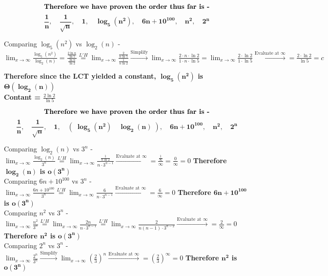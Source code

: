 \documentclass[9pt]{article}
\newcommand{\lp}{\left(}
\newcommand{\rp}{\right)}
\begin{document}
$$\text{\textbf{Therefore we have proven the order thus far is -}} $$
$$\mathbf{\frac{1}{n},\quad \frac{1}{\sqrt n} ,\quad 1,\quad \log_5 (n^2) ,\quad 6n+10^{100},\quad n^2,\quad 2^n}$$

Comparing $\log_5 (n^2)$ vs $\log_2 (n)$ - \\
$ \displaystyle \lim_{x \to \infty} \frac{\log_5 (n^2)}{\log_2 (n)} = \frac{\frac{2 \ln n}{\ln 5}}{\frac{\ln n}{\ln 2}} \stackrel{L'H}{=} \lim_{x \to \infty} \frac{\frac{2}{n\ln 5}}{\frac{1}{n\ln 2}} \stackrel{\text{Simplify}}{\rightarrow} \lim_{x \to \infty} \frac{2 \cdot n \cdot \ln 2}{1 \cdot n \cdot \ln 5} = \lim_{x \to \infty} \frac{2 \cdot \ln 2}{1 \cdot \ln 5} \stackrel{\text{Evaluate at }\infty}{\rightarrow} = \frac{2 \cdot \ln 2}{\ln 5} = c$\\
\begin{flushright}
\textbf{Therefore since the LCT yielded a constant, $\mathbf{\log_5 (n^2)}$ is $\mathbf{\Theta(\log_2 (n))}$}\\
\textbf{Contant = $\frac{2 \ln 2}{\ln 5}$}\\
\end{flushright}

$$\text{\textbf{Therefore we have proven the order thus far is -}} $$
$$\mathbf{\frac{1}{n},\quad \frac{1}{\sqrt n} ,\quad 1,\quad \lp\; \log_5 (n^2)\quad \log_2 (n) \;\rp,\quad 6n+10^{100},\quad n^2,\quad 2^n}$$

\newpage

Comparing $\log_2 (n)$ vs $3^n$ - \\
$ \displaystyle \lim_{x \to \infty} \frac{\log_2 (n)}{3^n} \stackrel{L'H}{=} \lim_{x \to \infty} \frac{\frac{1}{n \ln 2}}{n \cdot 3^{n-1}} \stackrel{\text{Evaluate at }\infty}{\rightarrow}  = \frac{\frac{1}{\infty}}{\infty} = \frac{0}{\infty} = 0$ \hfill \textbf{Therefore $\mathbf{\log_2 (n)}$ is $\mathbf{o(3^n)}$}\\
Comparing $6n+10^{100}$ vs $3^n$ - \\
$ \displaystyle \lim_{x \to \infty} \frac{6n+10^{100}}{3^n} \stackrel{L'H}{=} \lim_{x \to \infty} \frac{6}{n \cdot 3^{n-1}} \stackrel{\text{Evaluate at }\infty}{\rightarrow}  = \frac{6}{\infty} = 0$ \hfill \textbf{Therefore $\mathbf{6n+10^{100}}$ is $\mathbf{o(3^n)}$}\\
Comparing $n^2$ vs $3^n$ - \\
$ \displaystyle \lim_{x \to \infty} \frac{n^2}{3^n} \stackrel{L'H}{=} \lim_{x \to \infty} \frac{2n}{n \cdot 3^{n-1}} \stackrel{L'H}{=} \lim_{x \to \infty} \frac{2}{n(n-1) \cdot 3^{n-2}} \stackrel{\text{Evaluate at }\infty}{\rightarrow}  = \frac{2}{\infty} = 0$ \hfill \textbf{Therefore $\mathbf{n^2}$ is $\mathbf{o(3^n)}$}\\
Comparing $2^n$ vs $3^n$ - \\
$ \displaystyle \lim_{x \to \infty} \frac{2^n}{3^n} \stackrel{\text{Simplify}}{\rightarrow} \lim_{x \to \infty} \lp \frac{2}{3}\rp^n \stackrel{\text{Evaluate at }\infty}{\rightarrow}  = \lp \frac{2}{3} \rp ^\infty = 0$ \hfill \textbf{Therefore $\mathbf{n^2}$ is $\mathbf{o(3^n)}$}\\
\end{document}
